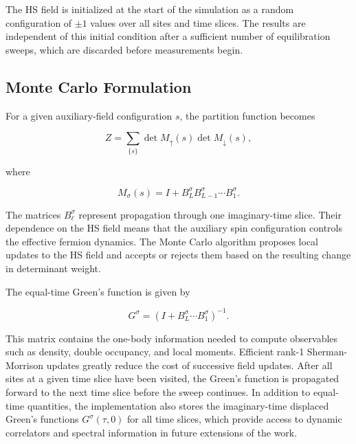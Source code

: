 \documentclass[9pt,a4paper,twocolumn,twoside]{rho-class/rho}
\begin{document}
The HS field is initialized at the start of the simulation as a random configuration of $\pm 1$ values over all sites and time slices. The results are independent of this initial condition after a sufficient number of equilibration sweeps, which are discarded before measurements begin.

\subsection{Monte Carlo Formulation}

For a given auxiliary-field configuration $s$, the partition function becomes

\begin{equation}
Z = \sum_{\{s\}} \det M_\uparrow(s)\det M_\downarrow(s),
\end{equation}

where

\begin{equation}
M_\sigma(s) = I + B^\sigma_L B^\sigma_{L-1}\cdots B^\sigma_1.
\end{equation}

The matrices $B^\sigma_\ell$ represent propagation through one imaginary-time slice. Their dependence on the HS field means that the auxiliary spin configuration controls the effective fermion dynamics. The Monte Carlo algorithm proposes local updates to the HS field and accepts or rejects them based on the resulting change in determinant weight.

The equal-time Green's function is given by

\begin{equation}
G^\sigma = \left(I + B^\sigma_L\cdots B^\sigma_1\right)^{-1}.
\end{equation}

This matrix contains the one-body information needed to compute observables such as density, double occupancy, and local moments. Efficient rank-1 Sherman-Morrison updates greatly reduce the cost of successive field updates. After all sites at a given time slice have been visited, the Green's function is propagated forward to the next time slice before the sweep continues. In addition to equal-time quantities, the implementation also stores the imaginary-time displaced Green's functions $G^\sigma(\tau, 0)$ for all time slices, which provide access to dynamic correlators and spectral information in future extensions of the work.
\end{document}
